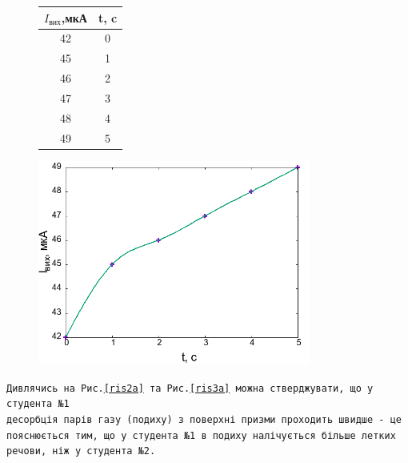 \documentclass[a4paper,14pt]{extreport}
\begin{document}
\begin{figure}[h]
\begin{minipage}{.45\textwidth}
  \centering
   \label{ris3a}
  \begin{tabular}{|c|c|}
    \hline
    $I_{\text{вих}}$,мкА & t, c \\ \hline
    42                 & 0    \\ \hline
    45                 & 1    \\ \hline
    46                 & 2    \\ \hline
    47                 & 3    \\ \hline
    48                 & 4    \\ \hline
    49                 & 5    \\ \hline
  \end{tabular}
\end{minipage}\hfill
\begin{minipage}{.55\textwidth}
  \centering 
  \includegraphics[width=0.8\textwidth]{lexa.png}
  \label{ris3b}
\end{minipage}
\caption{}
\end{figure}

\texttt{Дивлячись на Рис.\ref{ris2a}  та Рис.\ref{ris3a} можна стверджувати, що у студента №1 \\ десорбція парів газу (подиху) з поверхні призми проходить швидше - це \\пояснюється тим, що у студента №1 в подиху налічується більше летких \\ речови, ніж у студента №2.}
\end{document}
